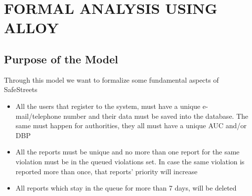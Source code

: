 \documentclass[12pt,a4paper]{article}
\begin{document}
\section{FORMAL ANALYSIS USING ALLOY}
\subsection{Purpose of the Model}
Through this model we want to formalize some fundamental aspects of SafeStreets
\begin{itemize}
				\item All the users that register to the system, must have a unique e-mail/telephone number and their data must be saved into the database. \newline The same must happen for authorities, they all must have a unique AUC and/or DBP
				\item All the reports must be unique and no more than one report for the same violation must be in the queued violations set. \newline In case the same violation is reported more than once, that reports' priority will increase
				\item All reports which stay in the queue for more than 7 days, will be deleted
\end{itemize}
\end{document}
